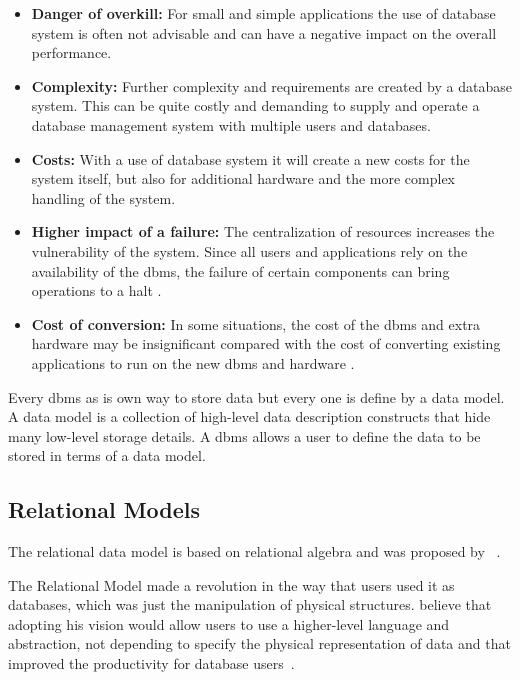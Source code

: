 \begin{itemize}
    \item \textbf{Danger of overkill:} For small and simple applications the use of database system is often not advisable and can have a negative impact on the overall performance. 
    \item \textbf{Complexity:} Further complexity and requirements are created by a database system. This can be quite costly and demanding to supply and operate a database management system with multiple users and databases.
    \item \textbf{Costs:} With a use of database system it will create a new costs for the system itself, but also for additional hardware and the more complex handling of the system.
    \item \textbf{Higher impact of a failure:} The centralization of resources increases the vulnerability of the system. Since all users and applications rely on the availability of the \gls{dbms}, the failure of certain components can bring operations to a halt \cite{begg}.
    \item \textbf{Cost of conversion:} In some situations, the cost of the \gls{dbms} and extra hardware may be insignificant compared with the cost of converting existing applications to run on the new \gls{dbms} and hardware \cite{begg}.
\end{itemize}


Every \gls{dbms} as is own way to store data but every one is define by a data model. A data model is a collection of high-level data description constructs that hide many low-level storage details. A \gls{dbms} allows a user to define the data to be stored in terms of a data model.


\subsection{Relational Models}
 The relational data model is based on relational algebra and was proposed by \citeauthor{codd}~\cite{codd}.
    
    The Relational Model made a revolution in the way that users used it as databases, which was just the manipulation of physical structures. \citeauthor{codd} believe that adopting his vision would allow users to use a higher-level language and abstraction, not depending to specify the physical representation of data and that improved the productivity for database users~\cite{codd2}.
    
